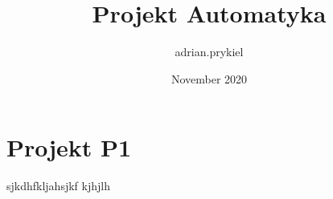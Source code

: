 \documentclass{article}
\title{Projekt Automatyka}
\author{adrian.prykiel }
\date{November 2020}
\begin{document}
\maketitle

\section{Projekt P1}
sjkdhfkljahsjkf
kjhjlh
\end{document}
